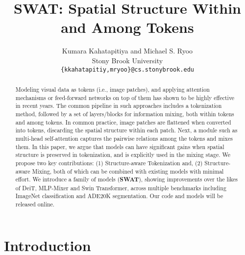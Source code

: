 \documentclass[10pt,twocolumn,letterpaper]{article}
\begin{document}
\title{SWAT: Spatial Structure Within and Among Tokens}


\author{Kumara Kahatapitiya and Michael S. Ryoo\\
Stony Brook University \\%
 {\tt\small \{kkahatapitiy,mryoo\}@cs.stonybrook.edu}%
}

\maketitle

\begin{abstract}
	
	Modeling visual data as tokens (i.e., image patches), and applying attention mechanisms or feed-forward networks on top of them has shown to be highly effective in recent years. The common pipeline in such approaches includes a tokenization method, followed by a set of layers/blocks for information mixing, both within tokens and among tokens. In common practice, image patches are flattened when converted into tokens, discarding the spatial structure within each patch. Next, a module such as multi-head self-attention captures the pairwise relations among the tokens and mixes them. In this paper, we argue that models can have significant gains when spatial structure is preserved in tokenization, and is explicitly used in the mixing stage. We propose two key contributions: (1) Structure-aware Tokenization and, (2) Structure-aware Mixing, both of which can be combined with existing models with minimal effort. We introduce a family of models (\textbf{SWAT}), showing improvements over the likes of DeiT, MLP-Mixer and Swin Transformer, across multiple benchmarks including ImageNet classification and ADE20K segmentation. Our code and models will be released online.
	
\end{abstract}


\section{Introduction}
\end{document}
